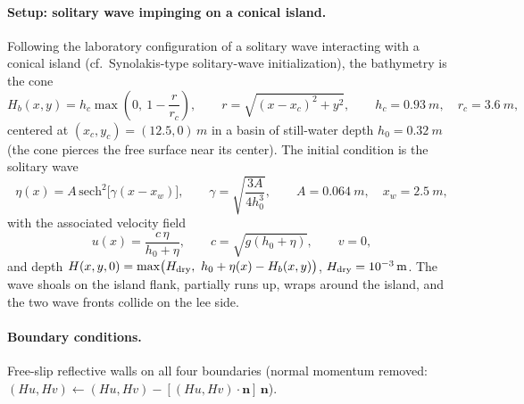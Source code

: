 \documentclass[11pt,a4paper]{article}
\begin{document}
\paragraph{Setup: solitary wave impinging on a conical island.}
Following the laboratory configuration of a solitary wave interacting
with a conical island (cf.\ Synolakis-type solitary-wave initialization),
the bathymetry is the cone
\begin{equation}
  H_b(x, y) = h_c \max\!\left( 0,\ 1 - \frac{r}{r_c} \right),
  \qquad
  r = \sqrt{(x - x_{c})^2 + y^2},
  \qquad
  h_c = \SI{0.93}{m}, \quad r_c = \SI{3.6}{m},
\end{equation}
centered at $(x_c, y_c) = (12.5, 0)\,\si{m}$ in a basin of still-water
depth $h_0 = \SI{0.32}{m}$ (the cone pierces the free surface near its
center). The initial condition is the solitary wave
\begin{equation}
  \eta(x) = A\,\mathrm{sech}^2\!\bigl[\gamma (x - x_w)\bigr],
  \qquad
  \gamma = \sqrt{\frac{3A}{4 h_0^3}},
  \qquad
  A = \SI{0.064}{m}, \quad x_w = \SI{2.5}{m},
\end{equation}
with the associated velocity field
\begin{equation}
  u(x) = \frac{c\,\eta}{h_0 + \eta},
  \qquad
  c = \sqrt{g (h_0 + \eta)},
  \qquad v = 0,
\end{equation}
and depth $H(x, y, 0) = \max\bigl(H_{\rm dry},\ h_0 + \eta(x) -
H_b(x,y)\bigr)$, $H_{\rm dry} = 10^{-3}\,\si{m}$. The wave shoals on the
island flank, partially runs up, wraps around the island, and the two
wave fronts collide on the lee side.

\paragraph{Boundary conditions.} Free-slip reflective walls on all four
boundaries (normal momentum removed:
$(Hu, Hv) \leftarrow (Hu, Hv) - [(Hu, Hv)\cdot\bm{n}]\,\bm{n}$).
\end{document}

